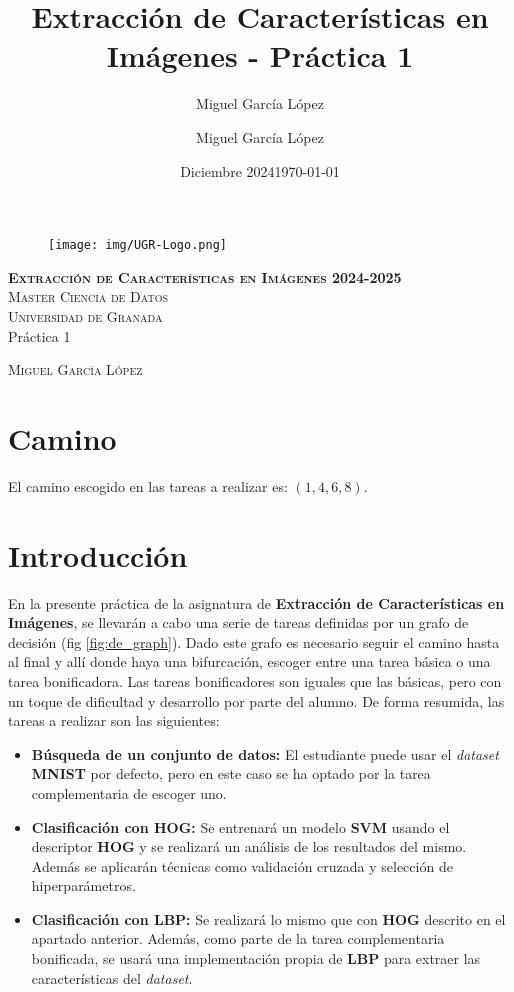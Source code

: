 \documentclass[12pt,letterpaper]{article}
\title{Extracción de Características en Imágenes - Práctica 1}
\author{Miguel García López}
\date{Diciembre 2024}
\author{Miguel García López} %
\date{\normalsize\today} %
\begin{document}
\begin{titlepage}
\begin{figure}
    \vspace{-1.3cm}
    \begin{center}
        \texttt{[image: img/UGR-Logo.png]}
    \end{center}
\end{figure}
\vspace{1.3cm}
\centering
\normalfont \normalsize
\textsc{\textbf{Extracción de Características en Imágenes 2024-2025} \\ \vspace{.15cm} Master Ciencia de Datos\\ \vspace{.15cm} Universidad de Granada} \\ [25pt] 
    \huge Práctica 1

\normalfont \normalsize \vspace{.30cm}
\textsc{Miguel García López}

\end{titlepage}

\tableofcontents
\listoffigures
\listoftables
\newpage

\section{Camino}
El camino escogido en las tareas a realizar es: $(1,4,6,8)$.

\section{Introducción}
En la presente práctica de la asignatura de \textbf{Extracción de Características en Imágenes}, se llevarán a cabo una serie de tareas definidas por un grafo de decisión (fig \ref{fig:de_graph}). Dado este grafo es necesario seguir el camino hasta al final y allí donde haya una bifurcación, escoger entre una tarea básica o una tarea bonificadora. Las tareas bonificadores son iguales que las básicas, pero con un toque de dificultad y desarrollo por parte del alumno. De forma resumida, las tareas a realizar son las siguientes: 

\begin{itemize}
    \item \textbf{Búsqueda de un conjunto de datos:} El estudiante puede usar el \textit{dataset} \textbf{MNIST} por defecto, pero en este caso se ha optado por la tarea complementaria de escoger uno.
    \item \textbf{Clasificación con HOG:} Se entrenará un modelo \textbf{SVM} usando el descriptor \textbf{HOG} y se realizará un análisis de los resultados del mismo. Además se aplicarán técnicas como validación cruzada y selección de hiperparámetros.
    \item \textbf{Clasificación con LBP:} Se realizará lo mismo que con \textbf{HOG} descrito en el apartado anterior. Además, como parte de la tarea complementaria bonificada, se usará una implementación propia de \textbf{LBP} para extraer las características del \textit{dataset}.
\end{itemize}
\end{document}
